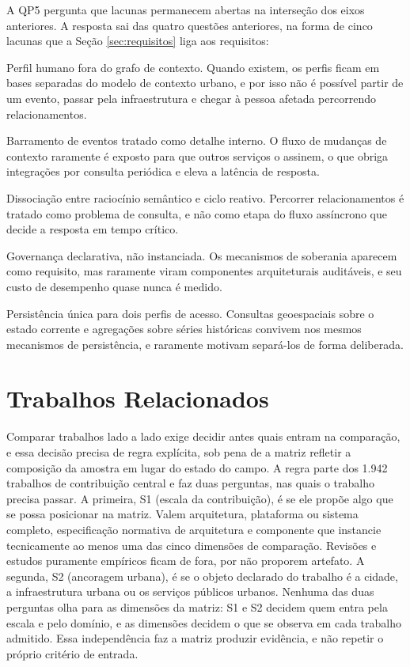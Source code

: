 A QP5 pergunta que lacunas permanecem abertas na interseção dos eixos anteriores. A resposta sai das quatro questões anteriores, na forma de cinco lacunas que a Seção \ref{sec:requisitos} liga aos requisitos:

\begin{description}[leftmargin=1.6cm,style=nextline]
	\item[L1] Perfil humano fora do grafo de contexto. Quando existem, os perfis ficam em bases separadas do modelo de contexto urbano, e por isso não é possível partir de um evento, passar pela infraestrutura e chegar à pessoa afetada percorrendo relacionamentos.
	\item[L2] Barramento de eventos tratado como detalhe interno. O fluxo de mudanças de contexto raramente é exposto para que outros serviços o assinem, o que obriga integrações por consulta periódica e eleva a latência de resposta.
	\item[L3] Dissociação entre raciocínio semântico e ciclo reativo. Percorrer relacionamentos é tratado como problema de consulta, e não como etapa do fluxo assíncrono que decide a resposta em tempo crítico.
	\item[L4] Governança declarativa, não instanciada. Os mecanismos de soberania aparecem como requisito, mas raramente viram componentes arquiteturais auditáveis, e seu custo de desempenho quase nunca é medido.
	\item[L5] Persistência única para dois perfis de acesso. Consultas geoespaciais sobre o estado corrente e agregações sobre séries históricas convivem nos mesmos mecanismos de persistência, e raramente motivam separá-los de forma deliberada.
\end{description}

\section{Trabalhos Relacionados}
\label{sec:relacionados}

Comparar trabalhos lado a lado exige decidir antes quais entram na comparação, e essa decisão precisa de regra explícita, sob pena de a matriz refletir a composição da amostra em lugar do estado do campo. A regra parte dos 1.942 trabalhos de contribuição central e faz duas perguntas, nas quais o trabalho precisa passar. A primeira, S1 (escala da contribuição), é se ele propõe algo que se possa posicionar na matriz. Valem arquitetura, plataforma ou sistema completo, especificação normativa de arquitetura e componente que instancie tecnicamente ao menos uma das cinco dimensões de comparação. Revisões e estudos puramente empíricos ficam de fora, por não proporem artefato. A segunda, S2 (ancoragem urbana), é se o objeto declarado do trabalho é a cidade, a infraestrutura urbana ou os serviços públicos urbanos. Nenhuma das duas perguntas olha para as dimensões da matriz: S1 e S2 decidem quem entra pela escala e pelo domínio, e as dimensões decidem o que se observa em cada trabalho admitido. Essa independência faz a matriz produzir evidência, e não repetir o próprio critério de entrada.

